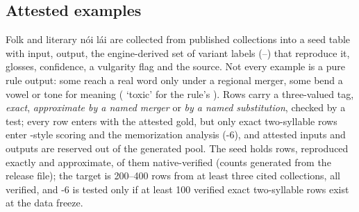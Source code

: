 \subsection{Attested examples}
\label{sec:attested}
Folk and literary nói lái are collected from published collections into a seed table with input, output, the engine-derived set of variant labels (--) that reproduce it, glosses, confidence, a vulgarity flag and the source. Not every example is a pure rule output: some reach a real word only under a regional merger, some bend a vowel or tone for meaning ( `toxic' for the rule's ). Rows carry a three-valued tag, \emph{exact}, \emph{approximate by a named merger} or \emph{by a named substitution}, checked by a test; every row enters  with the attested gold, but only exact two-syllable rows enter -style scoring and the memorization analysis (\hyp{6}), and attested inputs and outputs are reserved out of the generated pool. The seed holds \nAttested{} rows, \nAttestedExact{} reproduced exactly and \nAttestedApprox{} approximate, \nAttestedVerified{} of them native-verified (counts generated from the release file); the target is 200--400 rows from at least three cited collections, all verified, and \hyp{6} is tested only if at least 100 verified exact two-syllable rows exist at the data freeze.


